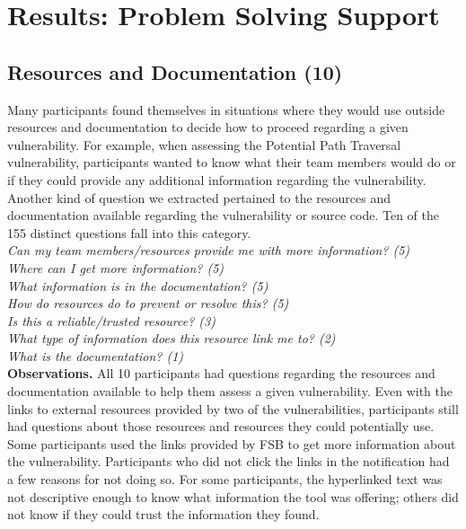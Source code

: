 \documentclass[conference]{IEEEtran}
\begin{document}
\section{Results: Problem Solving Support}
\label{sec:results-pss}



\noindent\subsection{\textbf{Resources and Documentation (10)}}\label{rd}

Many participants found themselves in situations where they would use outside resources and documentation to decide how to proceed regarding a given vulnerability.
For example, when assessing the Potential Path Traversal vulnerability, participants wanted to know what their team members would do or if they could provide any additional information regarding the vulnerability. 
Another kind of question we extracted pertained to the resources and documentation available regarding the vulnerability or source code. 
Ten of the 155 distinct questions fall into this category. 
\\

\noindent\emph{Can my team members/resources provide me with more information? (5)} \\
\emph{Where can I get more information? (5)} \\
\emph{What information is in the documentation? (5)} \\
\emph{How do resources do to prevent or resolve this? (5)} \\
\emph{Is this a reliable/trusted resource? (3)} \\
\emph{What type of information does this resource link me to? (2)} \\
\emph{What is the documentation? (1)} \\



\noindent\textbf{Observations.}
All 10 participants had questions regarding the resources and documentation available to help them assess a given vulnerability. 
Even with the links to external resources provided by two of the vulnerabilities, participants still had questions about those resources and resources they could potentially use. 
Some participants used the links provided by FSB to get more information about the vulnerability.
Participants who did not click the links in the notification had a few reasons for not doing so.
For some participants, the hyperlinked text was not descriptive enough to know what information the tool was offering; others did not know if they could trust the information they found.
\end{document}
